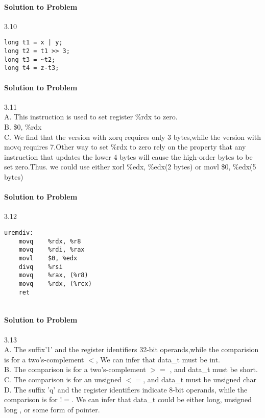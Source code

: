 \documentclass{report}
\begin{document}
\paragraph{Solution to Problem } 3.10 \\
\begin{lstlisting}
long t1 = x | y;
long t2 = t1 >> 3;
long t3 = ~t2;
long t4 = z-t3;
\end{lstlisting}

\paragraph{Solution to Problem } 3.11 \\
A. This instruction is used to set register \%rdx to zero. \\
B. \$0, \%rdx \\
C. We find that the version with xorq requires only 3 bytes,while the version with movq requires 7.Other way to set \%rdx to zero rely on the property that any instruction that updates the lower 4 bytes will cause the high-order bytes to be set zero.Thus. we could use either xorl \%edx, \%edx(2 bytes) or movl \$0, \%edx(5 bytes)


\paragraph{Solution to Problem } 3.12 \\
\begin{lstlisting}
uremdiv:
    movq    %rdx, %r8  
    movq    %rdi, %rax
    movl    $0, %edx
    divq    %rsi
    movq    %rax, (%r8)
    movq    %rdx, (%rcx)
    ret
    
\end{lstlisting}


\paragraph{Solution to Problem } 3.13 \\
A. The suffix'1' and the register identifiers 32-bit operands,while the comparision is for a two's-complement $<$, We can infer that data\_t must be int. \\
B. The comparison is for a two's-complement $>=$ , and data\_t must be short. \\
C. The comparison is for an unsigned $<=$, and data\_t must be unsigned char\\
D. The suffix 'q' and the register identifiers indicate 8-bit operands, while the comparison is for $!=$. We can infer that data\_t could be either long, unsigned long , or some form of pointer.
\end{document}
